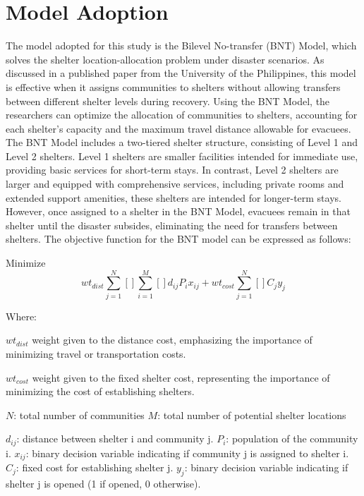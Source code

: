 \section{Model Adoption}
	The model adopted for this study is the Bilevel No-transfer (BNT) Model, which solves the shelter location-allocation problem under disaster scenarios. As discussed in a published paper from the University of the Philippines, this model is effective when it assigns communities to shelters without allowing transfers between different shelter levels during recovery. Using the BNT Model, the researchers can optimize the allocation of communities to shelters, accounting for each shelter’s capacity and the maximum travel distance allowable for evacuees.
	The BNT Model includes a two-tiered shelter structure, consisting of Level 1 and Level 2 shelters. Level 1 shelters are smaller facilities intended for immediate use, providing basic services for short-term stays. In contrast, Level 2 shelters are larger and equipped with comprehensive services, including private rooms and extended support amenities, these shelters are intended for longer-term stays. However, once assigned to a shelter in the BNT Model, evacuees remain in that shelter until the disaster subsides, eliminating the need for transfers between shelters.
	The objective function for the BNT model can be expressed as follows:
	
	Minimize \begin{equation} wt_{dist}\sum_{j=1}^{N}\left[  \right]\sum_{i=1}^{M}\left[  \right]d_{ij}P_{i}x_{ij}+wt_{cost}\sum_{j=1}^{N}\left[  \right]C_{j}y_{j} \end{equation}
	
	Where:
	
	$wt_{dist}$ weight given to the distance cost, emphasizing the importance of minimizing travel or transportation costs.
	
	$wt_{cost}$ weight given to the fixed shelter cost, representing the importance of minimizing the cost of establishing shelters.
	
	$N$: total number of communities
	$M$: total number of potential shelter locations
	
	$d_{ij}$: distance between shelter i and community j.
	$P_{i}$: population of the community i.
	$x_{ij}$: binary decision variable indicating if community j is assigned to shelter i.
	$C_{j}$: fixed cost for establishing shelter j.
	$y_{j}$: binary decision variable indicating if shelter j is opened (1 if opened, 0 otherwise).
	
